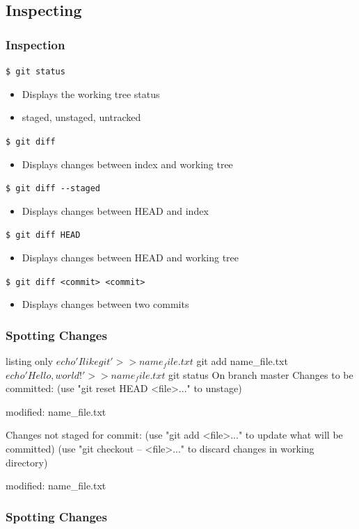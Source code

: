 \documentclass[english,compress]{beamer}
\begin{document}
\subsection{Inspecting}
\begin{frame}[fragile]
    \frametitle{Inspection}

    \verb|$ git status|
    \begin{itemize}
        \item Displays the working tree status
        \item staged, unstaged, untracked
    \end{itemize}
    \verb|$ git diff|
    \begin{itemize}
        \item Displays changes between index and working tree
    \end{itemize}
    \verb|$ git diff --staged|
    \begin{itemize}
        \item Displays changes between HEAD and index
    \end{itemize}
    \verb|$ git diff HEAD|
    \begin{itemize}
        \item Displays changes between HEAD and working tree
    \end{itemize}
    \verb|$ git diff <commit> <commit>|
    \begin{itemize}
        \item Displays changes between two commits
    \end{itemize}
\end{frame}

\begin{frame}[fragile]
    \frametitle{Spotting Changes}
    \begin{tcblisting}{listing only}
$ echo 'I like git' >> name_file.txt
$ git add name_file.txt
$ echo 'Hello, world!' >> name_file.txt
$ git status
On branch master
Changes to be committed:
  (use "git reset HEAD <file>..." to unstage)

	modified:   name_file.txt

Changes not staged for commit:
  (use "git add <file>..." to update what will be committed)
  (use "git checkout -- <file>..." to discard changes in working directory)

	modified:   name_file.txt
    \end{tcblisting}
\end{frame}

\begin{frame}[fragile]
    \frametitle{Spotting Changes}
\end{frame}
\end{document}
